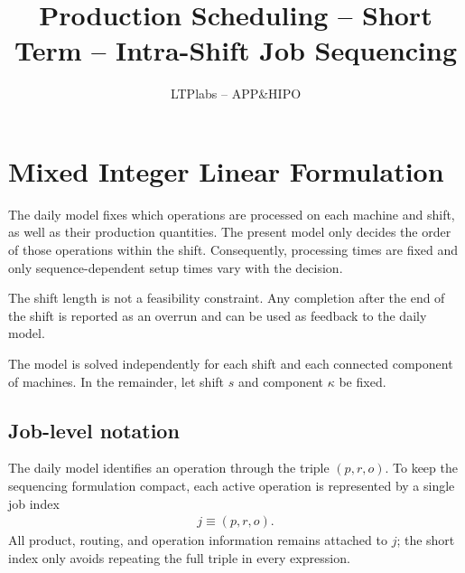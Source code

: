\documentclass{article}
\title{Production Scheduling -- Short Term -- Intra-Shift Job Sequencing}
\author{LTPlabs -- APP\&HIPO}
\date{}
\begin{document}
\maketitle

\section{Mixed Integer Linear Formulation}

The daily model fixes which operations are processed on each machine and shift,
as well as their production quantities. The present model only decides the
order of those operations within the shift. Consequently, processing times are
fixed and only sequence-dependent setup times vary with the decision.

The shift length is not a feasibility constraint. Any completion after the end
of the shift is reported as an overrun and can be used as feedback to the daily
model.

The model is solved independently for each shift and each connected component
of machines. In the remainder, let shift $s$ and component $\kappa$ be fixed.

\subsection{Job-level notation}

The daily model identifies an operation through the triple $(p,r,o)$. To keep
the sequencing formulation compact, each active operation is represented by a
single job index
\begin{align}
j \equiv (p,r,o).
\end{align}
All product, routing, and operation information remains attached to $j$; the
short index only avoids repeating the full triple in every expression.

\begingroup
\small
\setlength{\LTleft}{0pt}
\setlength{\LTright}{0pt}
\setlength{\tabcolsep}{4pt}
\renewcommand{\arraystretch}{1.15}
\end{document}
